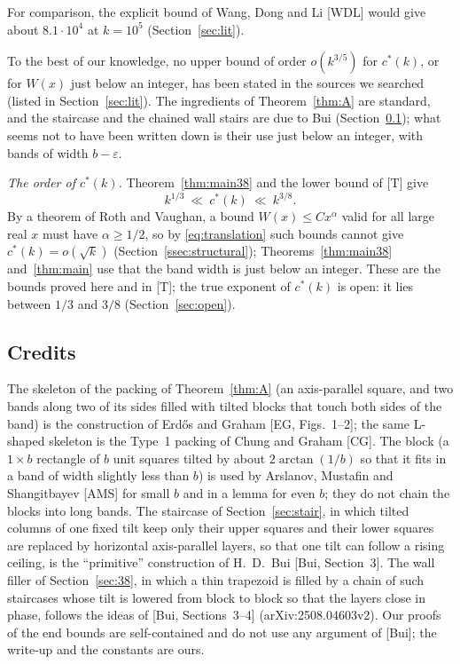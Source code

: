 \documentclass[11pt]{amsart}
\newcommand{\cs}{c^{*}}
\theoremstyle{definition}
\theoremstyle{remark}
\numberwithin{equation}{section}
\begin{document}
For comparison, the explicit bound of Wang, Dong and Li [WDL] would give about $8.1\cdot10^4$ at $k=10^5$
(Section~\ref{sec:lit}).

To the best of our knowledge, no upper bound of order $o(k^{3/5})$ for $\cs(k)$, or for $W(x)$ just below an integer,
has been stated in the sources we searched (listed in Section~\ref{sec:lit}). The ingredients of
Theorem~\ref{thm:A} are standard, and the staircase and the chained wall stairs are due to Bui
(Section~\ref{ssec:credit}); what seems not to have been written down is their use just below an integer, with bands of
width $b-\varepsilon$.

\emph{The order of $\cs(k)$.} Theorem~\ref{thm:main38} and the lower bound of [T] give
\[
k^{1/3}\ \ll\ \cs(k)\ \ll\ k^{3/8}.
\]
By a theorem of Roth and Vaughan, a bound $W(x)\le Cx^{\alpha}$ valid for all large real $x$ must have
$\alpha\ge1/2$, so by \eqref{eq:translation} such bounds cannot give $\cs(k)=o(\sqrt k)$
(Section~\ref{ssec:structural}); Theorems~\ref{thm:main38} and~\ref{thm:main} use that the band width is just below an
integer. These are the bounds proved here and in [T]; the true exponent of $\cs(k)$ is open: it lies between $1/3$ and
$3/8$ (Section~\ref{sec:open}).

\subsection{Credits}\label{ssec:credit}
The skeleton of the packing of Theorem~\ref{thm:A} (an axis-parallel square, and two bands along two of its sides
filled with tilted blocks that touch both sides of the band) is the construction of Erd\H{o}s and Graham [EG,
Figs.~1--2]; the same L-shaped skeleton is the Type~1 packing of Chung and Graham [CG]. The block (a $1\times b$
rectangle of $b$ unit squares tilted by about $2\arctan(1/b)$ so that it fits in a band of width slightly less than $b$)
is used by Arslanov, Mustafin and Shangitbayev [AMS] for small $b$ and in a lemma for even $b$; they do not chain the
blocks into long bands. The staircase of Section~\ref{sec:stair}, in which tilted columns of one fixed tilt keep only
their upper squares and their lower squares are replaced by horizontal axis-parallel layers, so that one tilt can
follow a rising ceiling, is the ``primitive'' construction of H.~D.~Bui [Bui, Section~3]. The wall filler of
Section~\ref{sec:38}, in which a thin trapezoid is filled by a chain of such staircases whose tilt is lowered from block
to block so that the layers close in phase, follows the ideas of [Bui, Sections~3--4] (arXiv:2508.04603v2). Our proofs
of the end bounds are self-contained and do not use any argument of [Bui]; the write-up and the constants are ours.
\end{document}
